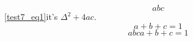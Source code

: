 
\begin{equation}\label{test7_eq1}
abc
\end{equation}
\autoref{test7_eq1}it's $\Delta^2+4ac$.
\begin{equation}
a+b+c=1
\end{equation}
\begin{equation}\label{test7_eq2}abc
a+b+c=1
\end{equation}